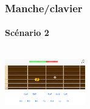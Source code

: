 \documentclass{beamer}
\begin{document}
	\begin{frame}

   		\frametitle{Manche/clavier}

       		\framesubtitle{Scénario 2}

		\begin{columns}

			 \begin{column}{0.33\textwidth}

				\includegraphics[width=3.5cm]{images/clavier_question.png}

			\end{column}

			 \begin{column}{0.33\textwidth}

				
			\end{column}

			 \begin{column}{0.33\textwidth}

				
			\end{column}

		\end{columns} 

	\end{frame}
\end{document}
